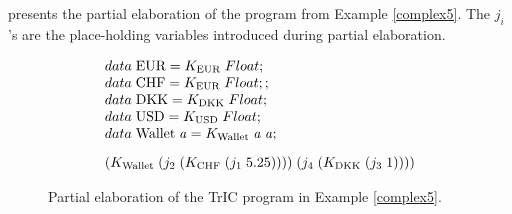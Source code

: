  presents the partial elaboration of the program from Example \ref{complex5}. The $j_i$'s are the place-holding variables introduced during partial elaboration.

\begin{figure}[H]
     \[
\begin{array}{@{\hspace{0mm}}l@{\hspace{0mm}}}
  data\;\text{EUR}=K_{\text{EUR}}\;Float;\\
  data\;\text{CHF}=K_{\text{EUR}}\;Float;;\\
  data\;\text{DKK}=K_{\text{DKK}}\;Float;\\
  data\;\text{USD}=K_{\text{USD}}\;Float;\\
  data\;\text{Wallet}\;\tyVar=K_{\text{Wallet}}\; \tyVar \; \tyVar;\\[3mm]
  (K_{\text{Wallet}}\;(j_2\;(K_{\text{CHF}}\;(j_1\; 5.25))))\;(j_4\; (K_{\text{DKK}}\;(j_3\;1)))) 

\end{array}
\]
\caption{Partial elaboration of the TrIC program in Example \ref{complex5}.}
\label{partialElab}
\end{figure}



